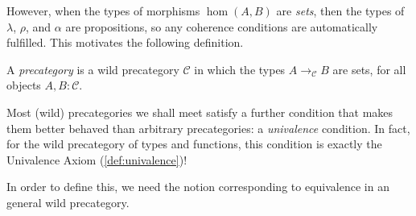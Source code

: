 However, when the types of morphisms $\hom(A,B)$ are \emph{sets}, then the types
of $\lambda$, $\rho$, and $\alpha$ are propositions, so any coherence conditions
are automatically fulfilled.
This motivates the following definition.

\begin{definition}\label{def:precategory}
  A \emph{precategory}
  is a wild precategory $\mathcal C$ in which the types
  $A \to_{\mathcal C} B$ are sets, for all objects $A,B : \mathcal C$.
\end{definition}

Most (wild) precategories we shall meet satisfy a further condition
that makes them better behaved than arbitrary precategories:
a \emph{univalence} condition.
In fact, for the wild precategory of types and functions,
this condition is exactly the Univalence Axiom (\cref{def:univalence})!

In order to define this, we need the notion corresponding to equivalence
in an general wild precategory.

